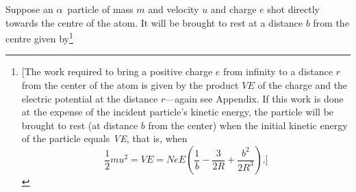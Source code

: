 Suppose an $\alpha$~particle of mass $m$ and velocity $u$\label{uRuth} and
charge $e$ shot directly towards the centre of the atom. It will be
brought to rest at a distance $b$ from the centre given
by\footnote{{[}The work required to bring a positive charge $e$
  from infinity to a distance $r$ from the center of the atom is
  given by the product $VE$ of the charge and the electric
  potential at the distance $r$---again see Appendix. If this
  work is done at the expense of the incident particle's kinetic energy,
  the particle will be brought to rest (at distance $b$ from the
  center) when the initial kinetic energy of the particle equals
  \emph{VE}, that is, when
  \begin{equation*}
  \frac{1}{2}mu^2 = VE = NeE\left(\frac{1}{b}-\frac{3}{2R}+\frac{b^2}{2R^3}\right).]
  \end{equation*}}

